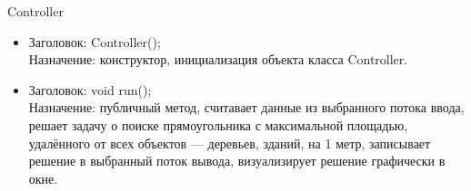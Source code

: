 \documentclass[12pt,a4paper]{article}
\begin{document}
{\begin{center}
Controller
\end{center}
\begin{itemize}
\item Заголовок: Controller(); \\
Назначение: конструктор, инициализация объекта класса Controller.
\item Заголовок: void run(); \\
Назначение: публичный метод, считавает данные из выбранного потока ввода, решает задачу о поиске прямоугольника с максимальной площадью, удалённого от всех объектов — деревьев, зданий, на 1 метр, записывает решение в выбранный поток вывода, визуализирует решение графически в окне.\\
\end{itemize}

}



\newpage
\end{document}
